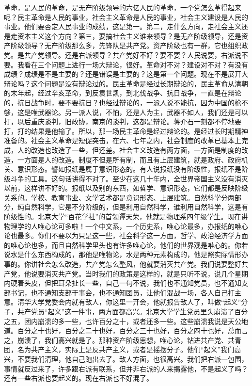 革命，是人民的革命，是无产阶级领导的六亿人民的革命，一个党怎么革得起来呢？民主革命是人民的事业，社会主义革命是人民的事业，社会主义建设是人民的事业。他们要否定人民事业的成绩，这是第一。第二，走什么方向，走社会主义还是走资本主义这个方向？第三，要搞社会主义谁来领导？是无产阶级领导，还是资产阶级领导？无产阶级那么多，先锋队是共产党。资产阶级也有一群，它也组织政党。是共产党领导。还是右派领导？共产党好不好？要不要？人民说要，右派说不要。我看在三个问题上进行一场大辩论，很好。革命对不对？建设对不对？有没有成绩？成绩是不是主要的？还是错误是主要的？这是第一个问题。现在不是展开大辩论吗？这个问题是没有辩论过的。民主革命是经过长期辩论的，民主革俞从清朝的末年起，经过辛亥革命，到反袁世凯，到北伐战争、抗日战争，一直是在辩论的，抗日战争时，要不要抗日？也经过辩论的，一派人说不能抗，因为中国的枪不够，这是唯武器论。另一派人说，不怕，还是人为主，武器不如人，我们还是可以打，以后重庆谈判，旧政协，南京的谈判，这都是辩论。蒋介石一刻都不停地要打，打的结果是他输了。所以，那一场民主革命是经过辩论的。是经过长时期精神准备的。社会主义革命是短促突击，在六、七年之内，社会制度的改革已基本上完成，人的改造也改造了一些，但还差。社会主义改造有两方面，一方面是制度的改造，一方面是人的改造。制度不但是所有制，而且有上层建筑，就是政府、政府机关、意识形态。譬如报纸是属于意识形态的。有人说报纸没有阶级性，报纸不是阶级斗争的工具。这句话讲得不对了。至少在这几十年内，全世界帝国主义没有消灭以前，这样讲不好的。报纸以及别的东西，如哲学、意识形态，它们都是反映阶级关系的。学校、教育事业、文学艺术都是意识形态、上层建筑。自然科学分两部分，纯自然科学，它是不分阶级的，但是利用自然科学，谁利用自然科学，这是有阶级性的。北京大学“百花学社”的首领谭天荣，他就是物理系四年级学生。现在讲物理学的人唯心论可多啦！一个中文系，一个历史系，唯心论最多，办报纸的唯心论也最多。你们不要以为只是这一些，社会科学这一方面，哲学、政治经济学方面的唯心论也多，而且自然科学里头也有许多唯心论，他们的世界观是唯心的。你若说水是什么东西构成的，那他是唯物论，水是两种元素构成的，他是照实际情形办事的。你讲社会怎么改造，共产党怎么整风，他就要消灭共产党。我们说要整好共产党，他说要消灭共产党。当时我们的政策是这样的，就是只听不说，说几个星期内硬着头皮，但把耳朵扯长一些，自己一句不说，我们也不通知党员，也不通知支部书记，也不通知支部干事会，也不通知团员，让他们混战一场，各人自己打主意。清华大学党委会内就有敌人，你这里一开会，他就报告敌人了，叫做“起义”分子，共产党员“起义”这一件事，两方面都高兴。北京大学学生党员里头崩溃了百分之五，团内崩溃的多一些，也许百分之十，或者还多一些。这些崩溃我说是天公地道。百分之十也好，百分之二十也好，百分之三十也好，百分之四十也好，总而言之，崩溃了，我们高兴就是了。那种资产阶级思想，唯心论，钻进共产党、共青团，名为共产主义，实际上是反共产主义，或者是摇摆分子。他们“起义”我们高兴，不要我们清理，他自己跑出去了。敌人方面，也很高兴。我们把右派一包围，事情就反过来了，许多跟右派有联系，但并非右派的人来揭露他，不是起义了吗？还有一些右派也要起义的。现在右派也不好混了。


